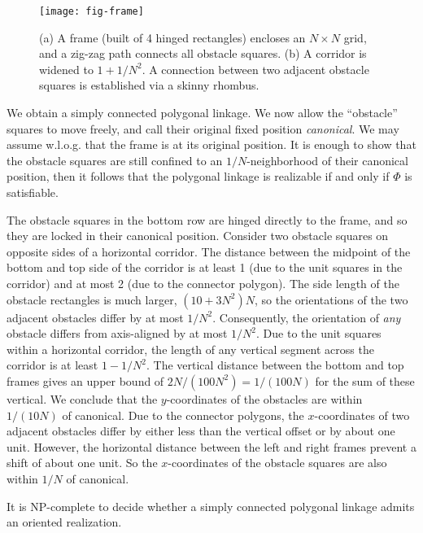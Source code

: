 \documentclass{llncs}
\begin{document}
\begin{figure}[htbp]
	\centering
	\texttt{[image: fig-frame]}
	\caption{(a) A frame (built of 4 hinged rectangles) encloses an $N\times N$ grid, and
    a zig-zag path connects all obstacle squares.
    (b) A corridor is widened to $1+1/N^2$. A connection between two adjacent obstacle squares is
     established via a skinny rhombus.}
	\label{fig:frame}
\end{figure}

We obtain a simply connected polygonal linkage. We now allow the ``obstacle'' squares
to move freely, and call their original fixed position \emph{canonical}. We may assume
w.l.o.g. that the frame is at its original position. It is enough to show that the obstacle
squares are still confined to an $1/N$-neighborhood of their canonical position, then it
follows that the polygonal linkage is realizable if and only if $\Phi$ is satisfiable.

The obstacle squares in the bottom row are hinged directly to the frame, and so they are
locked in their canonical position. Consider two obstacle squares on opposite sides of a
horizontal corridor. The distance between the midpoint of the bottom and top side of the
corridor is at least 1 (due to the unit squares in the corridor) and at most 2
(due to the connector polygon). The side length of the obstacle rectangles is much larger,
$(10+3N^2)N$, so the orientations of the two adjacent obstacles differ by at most
$1/N^2$. Consequently, the orientation of \emph{any} obstacle differs from
axis-aligned by at most $1/N^2$. Due to the unit squares within a horizontal
corridor, the length of any vertical segment across the corridor is at least
$1-1/N^2$. The vertical distance between the bottom and top frames gives an
upper bound of  $2N/(100N^2)=1/(100N)$ for the sum of these vertical.
We conclude that the $y$-coordinates of the obstacles are within $1/(10N)$
of canonical. Due to the connector polygons, the $x$-coordinates of
two adjacent obstacles differ by either less than the vertical offset
or by about one unit. However, the horizontal distance between the left and right
frames prevent a shift of about one unit. So the $x$-coordinates of the obstacle
squares are also within $1/N$ of canonical.


\begin{theorem}\label{thm:hinge2}
It is NP-complete to decide whether a simply connected polygonal linkage admits an oriented realization.
\end{theorem}
\end{document}
